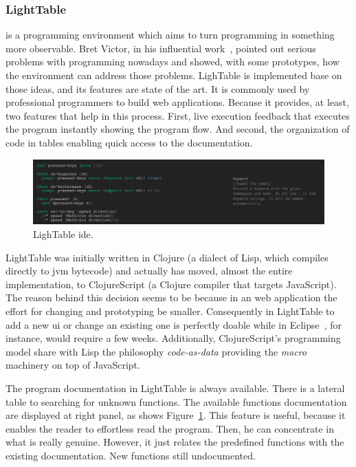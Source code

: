 \subsubsection{LightTable} is a programming environment which aims to turn programming in something more observable. Bret Victor, in his influential work~\cite{inventingPrin,learnableProg}, pointed out serious problems with programming nowadays and showed, with some prototypes, how the environment can address those problems. LighTable is implemented base on those ideas, and its features are  state of the art. It is commonly used by professional programmers to build web applications. Because it provides, at least, two features that help in this process. First, live execution feedback that executes the program instantly showing the program flow. And second, the organization of code in tables enabling quick access to the documentation.

\begin{figure}[!htbp]
\vspace{-10pt}
  \centering
  \includegraphics[width=1.0\textwidth]{img/lt2}
    \vspace{-20pt}
    \caption{LighTable \ac{ide}.}
    \vspace{-10pt}  
  \label{fig:lt}
\end{figure} 

LightTable was initially written in Clojure (a dialect of Lisp, which compiles directly to \ac{jvm} bytecode) and actually has moved, almost the entire implementation, to ClojureScript (a Clojure compiler that targets JavaScript). The reason behind this decision seems to be because in an web application the effort for changing and prototyping be smaller. Consequently in LightTable to add a new \ac{ui} or change an existing one is perfectly doable while in Eclipse~\cite{carlson2005eclipse}, for instance, would require a few weeks. Additionally, ClojureScript's programming model share with Lisp the philosophy \textit{code-as-data} providing the \textit{macro} machinery on top of JavaScript.

The program documentation in LightTable is always available. There is a lateral table to searching for unknown functions. The available functions documentation are displayed at right panel, as shows Figure~\ref{fig:lt}. This feature is useful, because it enables the reader to effortless read the program. Then, he can concentrate in what is really genuine. However, it just relates the predefined functions with the existing documentation. New functions still undocumented. 


